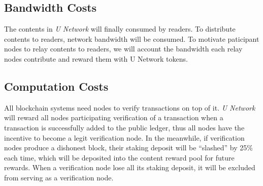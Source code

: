 \subsection{Bandwidth Costs}
The contents in \emph{U Network} will finally consumed by readers. To distribute contents to readers, network bandwidth will be consumed. To motivate paticipant nodes to relay contents to readers, we will account the bandwidth each relay nodes contribute and reward them with U Network tokens.

\subsection{Computation Costs}
All blockchain systems need nodes to verify transactions on top of it. \emph{U Network} will reward all nodes participating verification of a transaction when a transaction is successfully added to the public ledger, thus all nodes have the incentive to become a legit verification node. In the meanwhile, if verification nodes produce a dishonest block, their staking deposit will be ``slashed'' by 25\% each time, which will be deposited into the content reward pool for future rewards. When a verification node lose all its staking deposit, it will be excluded from serving as a verification node. 

